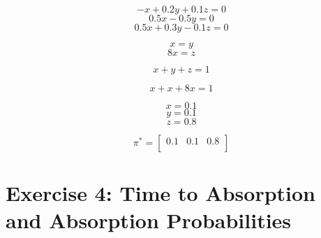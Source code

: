 \documentclass[unicode,11pt,a4paper,oneside,numbers=endperiod,openany]{scrartcl}
\begin{document}
    \begin{equation}
        -x + 0.2y + 0.1z = 0
    \end{equation}
    \begin{equation}
        0.5x - 0.5y = 0
    \end{equation}
    \begin{equation}
        0.5x + 0.3y - 0.1z = 0
    \end{equation}
    
    \begin{equation}
       x = y
    \end{equation}
    \begin{equation}
       8x = z
    \end{equation}
    
    \begin{equation}
       x + y + z = 1
    \end{equation}
    
    \begin{equation}
       x + x + 8x = 1
    \end{equation}
    
    \begin{equation}
       x = 0.1
    \end{equation}
    \begin{equation}
       y = 0.1
    \end{equation}
    \begin{equation}
       z = 0.8
    \end{equation}
    
    \[ \pi^* = 
		\begin{bmatrix}
                0.1 & 0.1 & 0.8\\
        \end{bmatrix}
   \]





\section*{Exercise 4: Time to Absorption and Absorption Probabilities}
\end{document}
